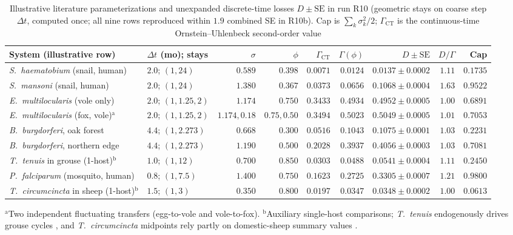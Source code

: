 \begin{table}[htbp]\centering\scriptsize
\setlength{\tabcolsep}{3.5pt}
\caption{Illustrative literature parameterizations and unexpanded discrete-time losses $D \pm \mathrm{SE}$ in run R10 (geometric stays on coarse step $\Delta t$, computed once; all nine rows reproduced within $1.9$ combined SE in R10b). Cap is $\sum_k \sigma_k^2/2$; $\Gamma_{\mathrm{CT}}$ is the continuous-time Ornstein--Uhlenbeck second-order value}\label{num-esm-tab-r10-sys}
\begin{tabular}{llrrrrrrr}\toprule
System (illustrative row) & $\Delta t$ (mo); stays & $\sigma$ & $\phi$ & $\Gamma_{\mathrm{CT}}$ & $\Gamma(\phi)$ & $D \pm \mathrm{SE}$ & $D/\Gamma$ & Cap\\\midrule
\emph{S.~haematobium} (snail, human) & $2.0$; $(1, 24)$ & $0.589$ & $0.398$ & $0.0071$ & $0.0124$ & $0.0137 \pm 0.0002$ & $1.11$ & $0.1735$\\
\emph{S.~mansoni} (snail, human) & $2.0$; $(1, 24)$ & $1.380$ & $0.367$ & $0.0373$ & $0.0656$ & $0.1068 \pm 0.0004$ & $1.63$ & $0.9522$\\
\emph{E.~multilocularis} (vole only) & $2.0$; $(1, 1.25, 2)$ & $1.174$ & $0.750$ & $0.3433$ & $0.4934$ & $0.4952 \pm 0.0005$ & $1.00$ & $0.6891$\\
\emph{E.~multilocularis} (fox, vole)$^{\mathrm{a}}$ & $2.0$; $(1, 1.25, 2)$ & $1.174, 0.18$ & $0.75, 0.50$ & $0.3494$ & $0.5023$ & $0.5049 \pm 0.0005$ & $1.01$ & $0.7053$\\
\emph{B.~burgdorferi}, oak forest & $4.4$; $(1, 2.273)$ & $0.668$ & $0.300$ & $0.0516$ & $0.1043$ & $0.1075 \pm 0.0001$ & $1.03$ & $0.2231$\\
\emph{B.~burgdorferi}, northern edge & $4.4$; $(1, 2.273)$ & $1.190$ & $0.500$ & $0.2028$ & $0.3937$ & $0.4056 \pm 0.0003$ & $1.03$ & $0.7081$\\
\emph{T.~tenuis} in grouse (1-host)$^{\mathrm{b}}$ & $1.0$; $(1, 12)$ & $0.700$ & $0.850$ & $0.0303$ & $0.0488$ & $0.0541 \pm 0.0004$ & $1.11$ & $0.2450$\\
\emph{P.~falciparum} (mosquito, human) & $0.8$; $(1, 7.5)$ & $1.400$ & $0.750$ & $0.1623$ & $0.2725$ & $0.3305 \pm 0.0007$ & $1.21$ & $0.9800$\\
\emph{T.~circumcincta} in sheep (1-host)$^{\mathrm{b}}$ & $1.5$; $(1, 3)$ & $0.350$ & $0.800$ & $0.0197$ & $0.0347$ & $0.0348 \pm 0.0002$ & $1.00$ & $0.0613$\\\bottomrule
\end{tabular}
\par\smallskip\raggedright\footnotesize
$^{\mathrm{a}}$Two independent fluctuating transfers (egg-to-vole and vole-to-fox). $^{\mathrm{b}}$Auxiliary single-host comparisons; \emph{T.~tenuis} endogenously drives grouse cycles \citep{dobson1992,hudson1992}, and \emph{T.~circumcincta} midpoints rely partly on domestic-sheep summary values \citep{kao2000}.
\end{table}

